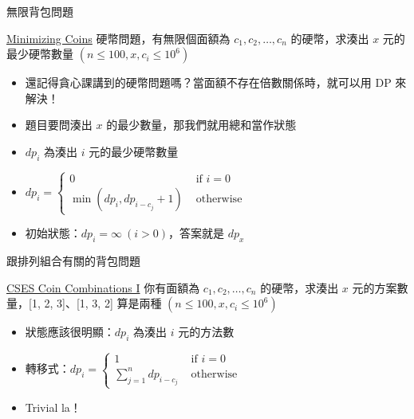 \documentclass[aspectratio=169]{beamer}
\begin{document}
    \begin{frame}{無限背包問題}
        \begin{block}{\href{https://cses.fi/problemset/task/1634}{Minimizing Coins}}
            硬幣問題，有無限個面額為 $c_1, c_2, \dots, c_n$ 的硬幣，求湊出 $x$ 元的最少硬幣數量 $(n \le 100, x, c_i \le 10^6)$
        \end{block}

        \begin{itemize}
            \item<1-> 還記得貪心課講到的硬幣問題嗎？當面額不存在倍數關係時，就可以用 DP 來解決！
            \item<2-> 題目要問湊出 $x$ 的最少數量，那我們就用總和當作狀態
            \item<3-> $dp_i$ 為湊出 $i$ 元的最少硬幣數量
            \item<4-> $dp_i = \begin{cases}
                0 & \text { if } i = 0 \\
                \min(dp_i, dp_{i - c_j} + 1) & \text { otherwise }
            \end{cases}$
            \item<5-> 初始狀態：$dp_i = \infty\ (i > 0)$，答案就是 $dp_x$
        \end{itemize}
    \end{frame}

    \begin{frame}{跟排列組合有關的背包問題}
        \begin{block}{\href{https://cses.fi/problemset/task/1635}{CSES Coin Combinations I}}
            你有面額為 $c_1, c_2, \dots, c_n$ 的硬幣，求湊出 $x$ 元的方案數量，[1, 2, 3]、[1, 3, 2] 算是兩種 $(n \le 100, x, c_i \le 10^6)$
        \end{block}

        \begin{itemize}
            \item<1-> 狀態應該很明顯：$dp_i$ 為湊出 $i$ 元的方法數
            \item<2-> 轉移式：$dp_i = \begin{cases}
                1 & \text { if } i = 0 \\
                \sum_{j = 1}^n dp_{i - c_j} & \text { otherwise }
            \end{cases}$
            \item<3-> Trivial la！
        \end{itemize}
    \end{frame}
\end{document}
